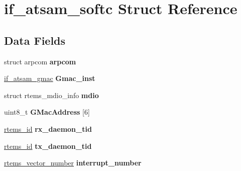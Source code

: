 \hypertarget{structif__atsam__softc}{}\section{if\+\_\+atsam\+\_\+softc Struct Reference}
\label{structif__atsam__softc}
\subsection*{Data Fields}
\begin{DoxyCompactItemize}
\item 
\mbox{\label{structif__atsam__softc_af01c6e112be1dd53bc317527ab35dcfe}} 
struct arpcom {\bfseries arpcom}
\item 
\mbox{\label{structif__atsam__softc_a716793d85f5e3ed81aa7cc1d3d33e979}} 
\mbox{\hyperlink{structif__atsam__gmac}{if\+\_\+atsam\+\_\+gmac}} {\bfseries Gmac\+\_\+inst}
\item 
\mbox{\label{structif__atsam__softc_af05db39ec6a8f701dd8a58fde9fe2a83}} 
struct rtems\+\_\+mdio\+\_\+info {\bfseries mdio}
\item 
\mbox{\label{structif__atsam__softc_a6d0ed0e6ba4ddc26d43196c1823e2efd}} 
uint8\+\_\+t {\bfseries G\+Mac\+Address} \mbox{[}6\mbox{]}
\item 
\mbox{\label{structif__atsam__softc_aee31f1d104eb411d919e62a6159862c5}} 
\mbox{\hyperlink{group__ClassicTasks_gab20892b814dced7dd4e5b9bf42becd57}{rtems\+\_\+id}} {\bfseries rx\+\_\+daemon\+\_\+tid}
\item 
\mbox{\label{structif__atsam__softc_a8cd3afc1ee072bb413043705d3c2ee0d}} 
\mbox{\hyperlink{group__ClassicTasks_gab20892b814dced7dd4e5b9bf42becd57}{rtems\+\_\+id}} {\bfseries tx\+\_\+daemon\+\_\+tid}
\item 
\mbox{\label{structif__atsam__softc_a716b6609792f1a71ed41cbe707801321}} 
\mbox{\hyperlink{group__ClassicINTR_ga3e434c197d99f128e78cae4d9358bd8b}{rtems\+\_\+vector\+\_\+number}} {\bfseries interrupt\+\_\+number}
\item 
\mbox{\label{structif__atsam__softc_a88fb8c5e6f113d9b1c891d90c5f813da}} 

\end{DoxyCompactItemize}
